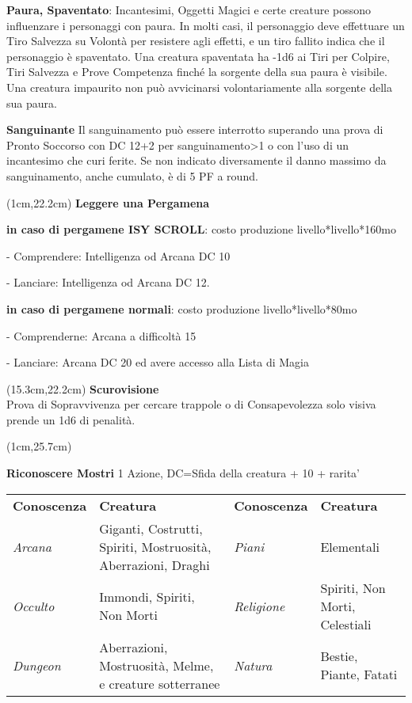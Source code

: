\documentclass[a4paper,12 pt,openany]{book}
\begin{document}
\begin{textblock*}{19 cm}
\begin{multicols}{2}
\textbf{Paura, Spaventato}: Incantesimi, Oggetti Magici e certe creature possono influenzare i personaggi con paura. In molti casi, il personaggio deve effettuare un Tiro Salvezza su Volontà per resistere agli effetti, e un tiro fallito indica che il personaggio è spaventato.
Una creatura spaventata ha -1d6 ai Tiri per Colpire, Tiri Salvezza e Prove Competenza finché la sorgente della sua paura è visibile. Una creatura impaurito non può avvicinarsi volontariamente alla sorgente della sua paura.


\textbf{Sanguinante} Il sanguinamento può essere interrotto superando una prova di Pronto Soccorso con DC 12+2 per sanguinamento>1 o con l'uso di un incantesimo che curi ferite.
Se non indicato diversamente il danno massimo da sanguinamento, anche cumulato, è di 5 PF a round.
\end{multicols}

\end{textblock*}


\begin{textblock*}{14 cm}(1cm,22.2cm)
\textbf{Leggere una Pergamena}

\textbf{in caso di pergamene ISY SCROLL}: costo produzione livello*livello*160mo

- Comprendere: Intelligenza od Arcana DC 10

- Lanciare: Intelligenza od Arcana DC 12.

\textbf{in caso di pergamene normali}: costo produzione livello*livello*80mo

- Comprenderne: Arcana a difficoltà 15

- Lanciare: Arcana DC 20 ed avere accesso alla Lista di Magia
\end{textblock*}


\begin{textblock*}{4.7cm}(15.3cm,22.2cm)
\textbf{Scurovisione}\\
Prova di Sopravvivenza per cercare trappole o di Consapevolezza solo visiva prende un 1d6 di penalità.
\end{textblock*}


\begin{textblock*}{19 cm}(1cm,25.7cm)

\textbf{Riconoscere Mostri} 1 Azione, 	DC=Sfida della creatura + 10 + rarita'

\begin{tabularx}{0.95\textwidth}{lX|lX}
\textbf{Conoscenza} & \textbf{Creatura}&\textbf{Conoscenza} & \textbf{Creatura}\\
\textit{Arcana}& Giganti, Costrutti, Spiriti, Mostruosità, Aberrazioni, Draghi&
\textit{Piani}& Elementali\\
\textit{Occulto}& Immondi, Spiriti, Non Morti&
\textit{Religione}& Spiriti, Non Morti, Celestiali\\
\textit{Dungeon}& Aberrazioni, Mostruosità, Melme, e creature sotterranee&
\textit{Natura}& Bestie, Piante, Fatati\\
\end{tabularx}

\end{textblock*}
\end{document}
